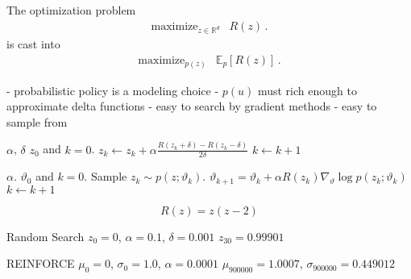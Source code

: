 \documentclass[aspectratio=169,8pt]{beamer}
\newcommand{\R}{\mathbb{R}}
\begin{document}
The optimization problem
\begin{equation}
\begin{array}{ll}
	\mbox{maximize}_{z\in\R^d} & R(z) \,.
	\end{array}
\end{equation}
is cast into
\begin{equation}
\begin{array}{ll}
	\mbox{maximize}_{p(z)} & \mathbb{E}_p[R(z)] \,.
\end{array}
\end{equation}

- probabilistic policy is a modeling choice \newline
- $p(u)$ must rich enough to approximate delta functions \newline
- easy to search by gradient methods \newline
- easy to sample from \newline
\eframe

\begin{algorithmic}[1]
 $\alpha$, $\delta$
 $z_0$ and $k = 0$.
\STATE $z_k \leftarrow z_k + \alpha \frac{R(z_k + \delta) - R(z_k - \delta)}{2 \delta}$
\STATE $k\leftarrow k + 1$
\ENDWHILE
\end{algorithmic}
\eframe

\begin{algorithmic}[1]
 $\alpha$.
 $\vartheta_0$ and $k = 0$.
\STATE Sample $z_k\sim p(z;\vartheta_k)$.
\STATE $\vartheta_{k+1} = \vartheta_k + \alpha R(z_k) \nabla_\vartheta \log p(z_k; \vartheta_k)$
\STATE $k\leftarrow k + 1$
\ENDWHILE
\end{algorithmic}
\eframe


\begin{equation}
  R(z) = z (z - 2)
\end{equation}

Random Search \newline
$z_0 = 0$, $\alpha = 0.1$, $\delta = 0.001$ \newline
$z_{30} = 0.99901$ \newline

REINFORCE \newline
$\mu_0 = 0$, $\sigma_0 = 1.0$, $\alpha = 0.0001$ \newline
$\mu_{900000} = 1.0007$,  $\sigma_{900000} = 0.449012$ \newline

\eframe
\end{document}
